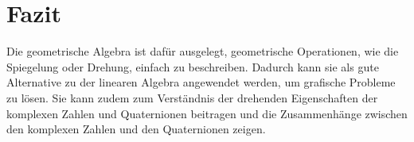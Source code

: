 %
%
%
\section{Fazit}

Die geometrische Algebra ist dafür ausgelegt, geometrische Operationen, wie die Spiegelung oder Drehung, einfach zu beschreiben. Dadurch kann sie als gute Alternative zu der linearen Algebra angewendet werden, um grafische Probleme zu lösen. Sie kann zudem zum Verständnis der drehenden Eigenschaften der komplexen Zahlen und Quaternionen beitragen und die Zusammenhänge zwischen den komplexen Zahlen und den Quaternionen zeigen.